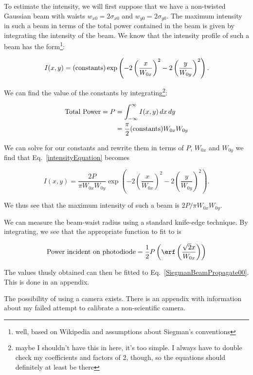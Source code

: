 To estimate the intensity, we will first suppose that we have a non-twisted Gaussian beam with waists $w_{x0}=2 \sigma_{x0}$ and $w_{y0}=2 \sigma_{y0}$. The maximum intensity in such a beam in terms of the total power contained in the beam is given by integrating the intensity of the beam. We know that the intensity profile of such a beam has the form\footnote{well, based on Wikipedia and assumptions about Siegman's conventions}:

\begin{equation}
I(x,y)=({\rm constants}) \exp \left( -2 \left(\frac{x}{W_{0x}} \right)^2-2 \left( \frac{y}{W_{0y}}\right)^2\right). \label{intensityEquation}
\end{equation}

We can find the value of the constants by integrating\footnote{maybe I shouldn't have this in here, it's too simple. I always have to double check my coefficients and factors of 2, though, so the equations should definitely at least be there}: 

\begin{align}
{\rm Total\ Power}=P&=\int_{-\infty}^\infty I(x,y)\, dx\, dy\\
&=\frac{\pi}{2}({\rm constants}) W_{0x} W_{0y}
\end{align}

We can solve for our constants and rewrite them in terms of $P$, $W_{0x}$ and $W_{0y}$ we find that Eq.\ \ref{intensityEquation} becomes 

\begin{equation}
I(x,y)= \frac{2 P}{\pi W_{0x} W_{0y}}\exp \left( -2 \left(\frac{x}{W_{0x}} \right)^2-2 \left( \frac{y}{W_{0y}}\right)^2\right). \label{intensityEquation2}
\end{equation}

We thus see that the maximum intensity of such a beam is $2P/\pi W_{0x}W_{0y}$.

We can measure the beam-waist radius using a standard knife-edge technique. By integrating, we see that the appropriate function to fit to is 

\begin{equation}
{\rm Power\ incident\ on\ photodiode}=\frac{1}{2} P \left(\erf \left( \frac{\sqrt{2} x}{W_{0x}}\right)\right)
\end{equation}


The values thusly obtained can then be fitted to Eq.\ \ref{SiegmanBeamPropagate00}. This is done in an appendix. 


The possibility of using a camera exists. There is an appendix with information about my failed attempt to calibrate a non-scientific camera. 


